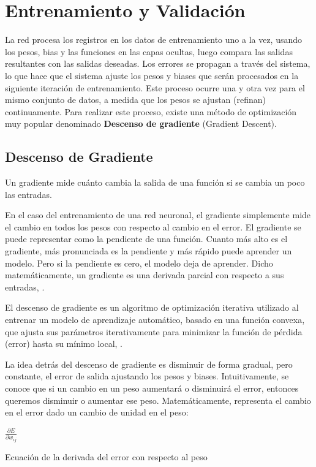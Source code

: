 \newpage
\section{Entrenamiento y Validación}

	La red procesa los registros en los datos de entrenamiento uno a la vez, usando los pesos, bias y las funciones en las capas ocultas, luego compara las salidas resultantes con las salidas deseadas. Los errores se propagan a través del sistema, lo que hace que el sistema ajuste los pesos y biases que serán procesados en la siguiente iteración de entrenamiento. Este proceso ocurre una y otra vez para el mismo conjunto de datos, a medida que los pesos se ajustan (refinan) continuamente. Para realizar este proceso, existe una método de optimización muy popular denominado {\bf Descenso de gradiente} (Gradient Descent).

	\subsection{Descenso de Gradiente}

		Un gradiente mide cuánto cambia la salida de una función si se cambia un poco las entradas.

		En el caso del entrenamiento de una red neuronal, el gradiente simplemente mide el cambio en todos los pesos con respecto al cambio en el error. El gradiente se puede representar como la pendiente de una función. Cuanto más alto es el gradiente, más pronunciada es la pendiente y más rápido puede aprender un modelo. Pero si la pendiente es cero, el modelo deja de aprender. Dicho matemáticamente, un gradiente es una derivada parcial con respecto a sus entradas, \citep{gradient}.

		El descenso de gradiente es un algoritmo de optimización iterativa utilizado al entrenar un modelo de aprendizaje automático, basado en una función convexa, que ajusta sus parámetros iterativamente para minimizar la función de pérdida (error) hasta su mínimo local, \citep{gradient}.

		La idea detrás del descenso de gradiente es disminuir de forma gradual, pero constante, el error de salida ajustando los pesos y biases. Intuitivamente, se conoce que si un cambio en un peso aumentará o disminuirá el error, entonces queremos disminuir o aumentar ese peso. Matemáticamente, representa el cambio en el error dado un cambio de unidad en el peso:

		\begingroup\makeatletter{}\check@mathfonts
		\begin{center}
		$ \frac{{\partial E}}{\partial w_{ij}}$
		\end{center}
		\begin{center}
		{\small{Ecuación de la derivada del error con respecto al peso}}
		\end{center}
		\endgroup
		
